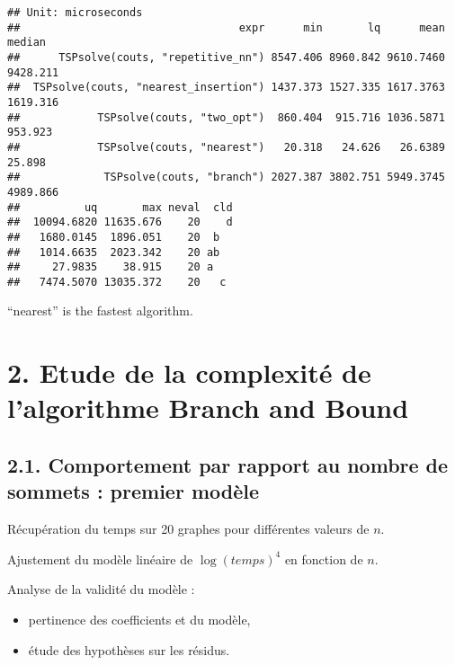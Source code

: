 \documentclass[
]{article}
\begin{document}
\begin{verbatim}
## Unit: microseconds
##                                  expr      min       lq      mean   median
##      TSPsolve(couts, "repetitive_nn") 8547.406 8960.842 9610.7460 9428.211
##  TSPsolve(couts, "nearest_insertion") 1437.373 1527.335 1617.3763 1619.316
##            TSPsolve(couts, "two_opt")  860.404  915.716 1036.5871  953.923
##            TSPsolve(couts, "nearest")   20.318   24.626   26.6389   25.898
##             TSPsolve(couts, "branch") 2027.387 3802.751 5949.3745 4989.866
##          uq       max neval  cld
##  10094.6820 11635.676    20    d
##   1680.0145  1896.051    20  b  
##   1014.6635  2023.342    20 ab  
##     27.9835    38.915    20 a   
##   7474.5070 13035.372    20   c
\end{verbatim}

``nearest'' is the fastest algorithm.

\hypertarget{etude-de-la-complexituxe9-de-lalgorithme-branch-and-bound}{%
\section{2. Etude de la complexité de l'algorithme Branch and
Bound}\label{etude-de-la-complexituxe9-de-lalgorithme-branch-and-bound}}

\hypertarget{comportement-par-rapport-au-nombre-de-sommets-premier-moduxe8le}{%
\subsection{2.1. Comportement par rapport au nombre de sommets : premier
modèle}\label{comportement-par-rapport-au-nombre-de-sommets-premier-moduxe8le}}

Récupération du temps sur 20 graphes pour différentes valeurs de \(n\).

Ajustement du modèle linéaire de \(\log(temps)^4\) en fonction de \(n\).

Analyse de la validité du modèle :

\begin{itemize}
\item
  pertinence des coefficients et du modèle,
\item
  étude des hypothèses sur les résidus.
\end{itemize}
\end{document}
